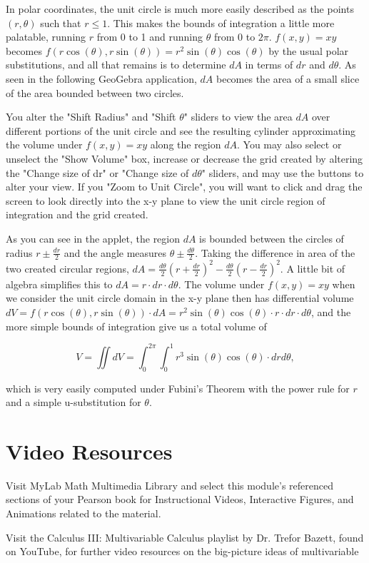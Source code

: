 \documentclass{ximera}
\begin{document}
In polar coordinates, the unit circle is much more easily described as the points $(r,\theta)$ such that $r\leq 1$. This makes the bounds of integration a little more palatable, running $r$ from 0 to 1 and running $\theta$ from 0 to $2 \pi$. $f(x,y)=xy$ becomes $f(r\cos(\theta),r\sin(\theta))=r^2\sin(\theta)\cos(\theta)$ by the usual polar substitutions, and all that remains is to determine $dA$ in terms of $dr$ and $d\theta$. As seen in the following GeoGebra application, $dA$ becomes the area of a small slice of the area bounded between two circles.

You alter the "Shift Radius" and "Shift $\theta$" sliders to view the area $dA$ over different portions of the unit circle and see the resulting cylinder approximating the volume under $f(x,y)=xy$ along the region $dA$. You may also select or unselect the "Show Volume" box, increase or decrease the grid created by altering the "Change size of dr" or "Change size of $d\theta$" sliders, and may use the buttons to alter your view. If you "Zoom to Unit Circle", you will want to click and drag the screen to look directly into the x-y plane to view the unit circle region of integration and the grid created.

\begin{center}
\end{center}

As you can see in the applet, the region $dA$ is bounded between the circles of radius $r\pm \frac{dr}{2}$ and the angle measures $\theta\pm \frac{d\theta}{2}$. Taking the difference in area of the two created circular regions, $dA=\frac{d\theta}{2}(r+\frac{dr}{2})^2-\frac{d\theta}{2}(r-\frac{dr}{2})^2$. A little bit of algebra simplifies this to $dA=r\cdot dr\cdot d\theta$. The volume under $f(x,y)=xy$ when we consider the unit circle domain in the x-y plane then has differential volume $dV=f(r\cos(\theta),r\sin(\theta))\cdot dA=r^2\sin(\theta)\cos(\theta)\cdot r\cdot dr\cdot d\theta$, and the more simple bounds of integration give us a total volume of

$$V=\iint dV=\int_0^{2\pi}\int_0^1r^3\sin(\theta)\cos(\theta)\cdot drd\theta,$$

which is very easily computed under Fubini's Theorem with the power rule for $r$ and a simple u-substitution for $\theta$.

\section{Video Resources}

Visit MyLab Math Multimedia Library and select this module's referenced sections of your Pearson book for Instructional Videos, Interactive Figures, and Animations related to the material.

Visit the Calculus III: Multivariable Calculus playlist by Dr. Trefor Bazett, found on YouTube, for further video resources on the big-picture ideas of multivariable
\end{document}
